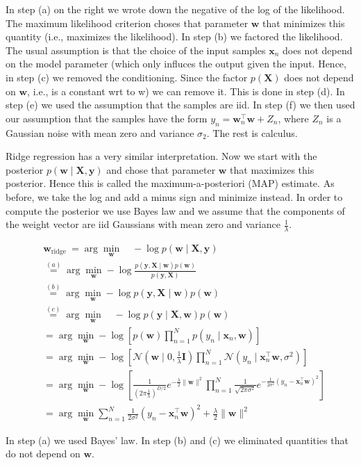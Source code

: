 \documentclass[10pt]{article}
\begin{document}
In step (a) on the right we wrote down the negative of the log of the likelihood. The maximum likelihood criterion choses that parameter $\mathbf{w}$ that minimizes this quantity (i.e., maximizes the likelihood). In step (b) we factored the likelihood. The usual assumption is that the choice of the input samples $\mathbf{x}_{n}$ does not depend on the model parameter (which only influces the output given the input. Hence, in step (c) we removed the conditioning. Since the factor $p(\mathbf{X})$ does not depend on $\mathbf{w}$, i.e., is a constant wrt to w) we can remove it. This is done in step (d). In step (e) we used the assumption that the samples are iid. In step (f) we then used our assumption that the samples have the form $y_{n}=\mathbf{w}_{n}^{\top} \mathbf{w}+Z_{n}$,
where $Z_{n}$ is a Gaussian noise with mean zero and variance $\sigma_{2}$. The rest is calculus.

Ridge regression has a very similar interpretation. Now we start with the posterior $p(\mathbf{w} \mid \mathbf{X}, \mathbf{y})$ and chose that parameter $\mathbf{w}$ that maximizes this posterior. Hence this is called the maximum-a-posteriori (MAP) estimate. As before, we take the log and add a minus sign and minimize instead. In order to compute the posterior we use Bayes law and we assume that the components of the weight vector are iid Gaussians with mean zero and variance $\frac{1}{\lambda}$.

$$
\begin{aligned}
& \mathbf{w}_{\text {ridge }}=\arg \min _{\mathbf{w}} \quad-\log p(\mathbf{w} \mid \mathbf{X}, \mathbf{y}) \\
& \stackrel{(a)}{=} \arg \min _{\mathbf{w}}-\log \frac{p(\mathbf{y}, \mathbf{X} \mid \mathbf{w}) p(\mathbf{w})}{p(\mathbf{y}, \mathbf{X})} \\
& \stackrel{(b)}{=} \arg \min _{\mathbf{w}}-\log p(\mathbf{y}, \mathbf{X} \mid \mathbf{w}) p(\mathbf{w}) \\
& \stackrel{(c)}{=} \arg \min _{\mathbf{w}} \quad-\log p(\mathbf{y} \mid \mathbf{X}, \mathbf{w}) p(\mathbf{w}) \\
& =\arg \min _{\mathbf{w}}-\log \left[p(\mathbf{w}) \prod_{n=1}^{N} p\left(y_{n} \mid \mathbf{x}_{n}, \mathbf{w}\right)\right] \\
& =\arg \min _{\mathbf{w}}-\log \left[\mathcal{N}\left(\mathbf{w} \mid 0, \frac{1}{\lambda} \mathbf{I}\right) \prod_{n=1}^{N} \mathcal{N}\left(y_{n} \mid \mathbf{x}_{n}^{\top} \mathbf{w}, \sigma^{2}\right)\right] \\
& =\arg \min _{\mathbf{w}}-\log \left[\frac{1}{\left(2 \pi \frac{1}{\lambda}\right)^{D / 2}} e^{-\frac{\lambda}{2}\|\mathbf{w}\|^{2}} \prod_{n=1}^{N} \frac{1}{\sqrt{2 \pi \sigma^{2}}} e^{-\frac{1}{2 \sigma^{2}}\left(y_{n}-\mathbf{x}_{n}^{\top} \mathbf{w}\right)^{2}}\right] \\
& =\arg \min _{\mathbf{w}} \sum_{n=1}^{N} \frac{1}{2 \sigma^{2}}\left(y_{n}-\mathbf{x}_{n}^{\top} \mathbf{w}\right)^{2}+\frac{\lambda}{2}\|\mathbf{w}\|^{2}
\end{aligned}
$$

In step (a) we used Bayes' law. In step (b) and (c) we eliminated quantities that do not depend on $\mathbf{w}$.
\end{document}
